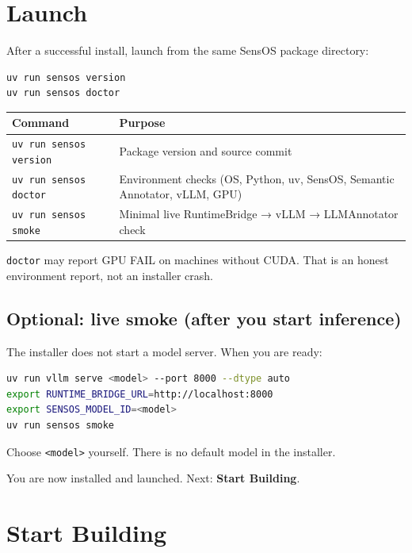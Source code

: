 \documentclass[11pt,a4paper,oneside]{article}
\newcommand{\pathcode}[1]{\texttt{#1}}
\begin{document}
\section{Launch}
\label{sec:launch}

After a successful install, launch from the same SensOS package directory:

\begin{lstlisting}[language=bash]
uv run sensos version
uv run sensos doctor
\end{lstlisting}

\begin{center}
\begin{tabularx}{\textwidth}{@{}Y L@{}}
\toprule
\textbf{Command} & \textbf{Purpose} \\
\midrule
\texttt{uv run sensos version} & Package version and source commit \\
\texttt{uv run sensos doctor} & Environment checks (OS, Python, uv, SensOS, Semantic Annotator, vLLM, GPU) \\
\texttt{uv run sensos smoke} & Minimal live RuntimeBridge → vLLM → LLMAnnotator check \\
\bottomrule
\end{tabularx}
\end{center}

\pathcode{doctor} may report GPU FAIL on machines without CUDA. That is an honest environment report, not an installer crash.

\subsection{Optional: live smoke (after you start inference)}

The installer does not start a model server. When you are ready:

\begin{lstlisting}[language=bash]
uv run vllm serve <model> --port 8000 --dtype auto
export RUNTIME_BRIDGE_URL=http://localhost:8000
export SENSOS_MODEL_ID=<model>
uv run sensos smoke
\end{lstlisting}

Choose \pathcode{<model>} yourself. There is no default model in the installer.

You are now installed and launched. Next: \textbf{Start Building}.

\section{Start Building}
\label{sec:building}
\end{document}
